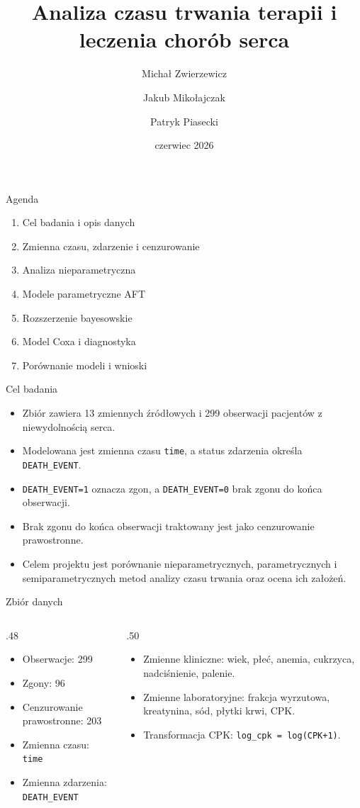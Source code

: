 \documentclass[aspectratio=169]{beamer}
\title{Analiza czasu trwania terapii i leczenia chorób serca}
\author{Michał Zwierzewicz \and Jakub Mikołajczak \and Patryk Piasecki}
\date{czerwiec 2026}
\begin{document}
\begin{frame}\titlepage\end{frame}
\begin{frame}{Agenda}
\begin{enumerate}
\item Cel badania i opis danych
\item Zmienna czasu, zdarzenie i cenzurowanie
\item Analiza nieparametryczna
\item Modele parametryczne AFT
\item Rozszerzenie bayesowskie
\item Model Coxa i diagnostyka
\item Porównanie modeli i wnioski
\end{enumerate}
\end{frame}
\begin{frame}{Cel badania}
\begin{itemize}
\item Zbiór zawiera 13 zmiennych źródłowych i 299 obserwacji pacjentów z niewydolnością serca.
\item Modelowana jest zmienna czasu \texttt{time}, a status zdarzenia określa \texttt{DEATH\_EVENT}.
\item \texttt{DEATH\_EVENT=1} oznacza zgon, a \texttt{DEATH\_EVENT=0} brak zgonu do końca obserwacji.
\item Brak zgonu do końca obserwacji traktowany jest jako cenzurowanie prawostronne.
\item Celem projektu jest porównanie nieparametrycznych, parametrycznych i semiparametrycznych metod analizy czasu trwania oraz ocena ich założeń.
\end{itemize}
\end{frame}
\begin{frame}{Zbiór danych}
\begin{columns}[T,totalwidth=\textwidth]
\begin{column}{.48\textwidth}
\begin{itemize}
\item Obserwacje: 299
\item Zgony: 96
\item Cenzurowanie prawostronne: 203
\item Zmienna czasu: \texttt{time}
\item Zmienna zdarzenia: \texttt{DEATH\_EVENT}
\end{itemize}
\end{column}
\begin{column}{.50\textwidth}
\begin{itemize}
\item Zmienne kliniczne: wiek, płeć, anemia, cukrzyca, nadciśnienie, palenie.
\item Zmienne laboratoryjne: frakcja wyrzutowa, kreatynina, sód, płytki krwi, CPK.
\item Transformacja CPK: \texttt{log\_cpk = log(CPK+1)}.
\end{itemize}
\end{column}
\end{columns}
\end{frame}
\end{document}
